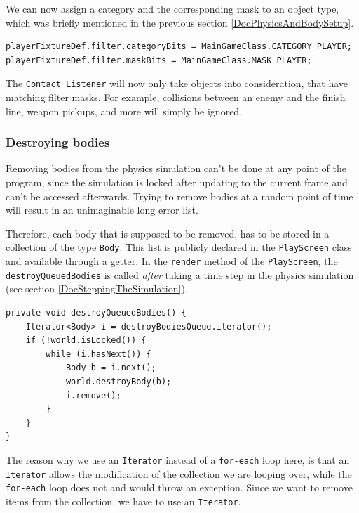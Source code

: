 \documentclass[12p]{article}
\begin{document}
We can now assign a category and the corresponding mask to an object type, which was briefly mentioned in the previous section \ref{DocPhysicsAndBodySetup}.

\begin{verbatim}
playerFixtureDef.filter.categoryBits = MainGameClass.CATEGORY_PLAYER;
playerFixtureDef.filter.maskBits = MainGameClass.MASK_PLAYER;
\end{verbatim}

The \texttt{Contact Listener} will now only take objects into consideration, that have matching filter masks. For example, collisions between an enemy and the finish line, weapon pickups, and more will simply be ignored.


\subsubsection{Destroying bodies} \label{DocDestroyingBodies}

Removing bodies from the physics simulation can't be done at any point of the program, since the simulation is locked after updating to the current frame and can't be accessed afterwards. Trying to remove bodies at a random point of time will result in an unimaginable long error list.

Therefore, each body that is supposed to be removed, has to be stored in a collection of the type \texttt{Body}. This list is publicly declared in the \texttt{PlayScreen} class and available through a getter. In the \texttt{render} method of the \texttt{PlayScreen}, the \texttt{destroyQueuedBodies} is called \emph{after} taking a time step in the physics simulation (see section \ref{DocSteppingTheSimulation}).

\begin{verbatim}
private void destroyQueuedBodies() {
    Iterator<Body> i = destroyBodiesQueue.iterator();
    if (!world.isLocked()) {
        while (i.hasNext()) {
            Body b = i.next();
            world.destroyBody(b);
            i.remove();
        }
    }
}
\end{verbatim}

The reason why we use an \texttt{Iterator} instead of a \texttt{for-each} loop here, is that an \texttt{Iterator} allows the modification of the collection we are looping over, while the \texttt{for-each} loop does not and would throw an exception. Since we want to remove items from the collection, we have to use an \texttt{Iterator}.
\end{document}
